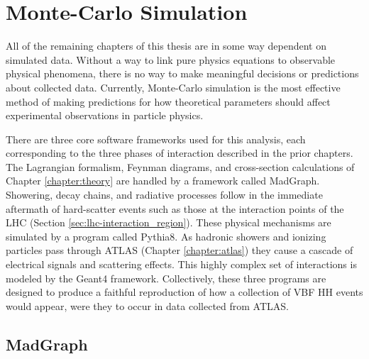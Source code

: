 \FloatBarrier
\section{Monte-Carlo Simulation} \label{sec:mcsim}
    
    All of the remaining chapters of this thesis are in some way dependent on simulated data.
    Without a way to link pure physics equations to observable physical phenomena,
        there is no way to make meaningful decisions or predictions about collected data.
    Currently, Monte-Carlo simulation is the most effective method of making predictions
        for how theoretical parameters should affect experimental observations in particle physics.

    There are three core software frameworks used for this analysis,
        each corresponding to the three phases of interaction described in the prior chapters.
    The Lagrangian formalism, Feynman diagrams, and cross-section calculations of Chapter \ref{chapter:theory}
        are handled by a framework called MadGraph.
    Showering, decay chains, and radiative processes follow in the immediate aftermath of
        hard-scatter events such as those at the interaction points of the LHC (Section \ref{sec:lhc-interaction_region}).
    These physical mechanisms are simulated by a program called Pythia8.
    As hadronic showers and ionizing particles pass through ATLAS (Chapter \ref{chapter:atlas})
        they cause a cascade of electrical signals and scattering effects.
    This highly complex set of interactions is modeled by the Geant4 framework.
    Collectively, these three programs are designed to
        produce a faithful reproduction of how a collection of VBF \to HH events would appear,
        were they to occur in data collected from ATLAS.


    \subsection{MadGraph}

